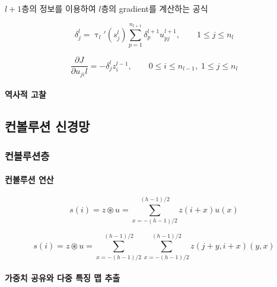 \documentclass [12pt] {oblivoir}
\let\oldsubsubsection=\subsubsection
\renewcommand{\subsubsection}
{
  \filbreak
  \oldsubsubsection
}
\begin{document}
$l + 1$층의 정보를 이용하여 $l$층의 gradient를 계산하는 공식

\begin{equation} \tag{4.8}
  \delta_{j}^{l} = \uptau_{l}'(s_{j}^{l})\sum_{p=1}^{n_{l+1}}\delta_{p}^{l+1}u_{pj}^{l+1}, \qquad 1 \le j \le n_{l}
\end{equation}

\begin{equation} \tag{4.9}
  \frac{\partial J}{\partial u_{ji}{l}} = -\delta_{j}^{l}z_{i}^{l-1}, \qquad 0 \le i \le n_{l-1}, \; 1\le j \le n_{l}
\end{equation}
\vspace{3mm}

\paragraph*{역사적 고찰}\mbox{}

\vspace{3mm}

\subsection{컨볼루션 신경망}

\subsubsection{컨볼루션층}

\paragraph*{컨볼루션 연산}\mbox{}

\begin{equation} \tag{4.10}
  s(i) = z \circledast u = \sum_{x=-(h - 1) / 2}^{(h - 1) / 2}z(i + x)u(x)
\end{equation}

\begin{equation} \tag{4.11}
  s(i) = z \circledast u = \sum_{x=-(h - 1) / 2}^{(h - 1) / 2}\sum_{x = -(h - 1) / 2}^{(h - 1) / 2}z(j + y, i + x)(y, x)
\end{equation}

\vspace{3mm}

\paragraph*{가중치 공유와 다중 특징 맵 추출}\mbox{}
\end{document}
